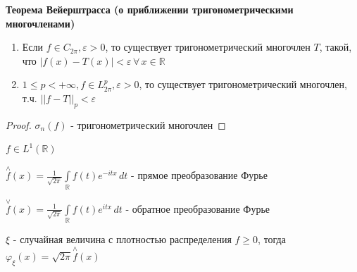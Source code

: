 \begin{theorem}
    \textbf{Теорема Вейерштрасса (о приближении тригонометрическими многочленами)}

    \begin{enumerate}
        \item {
            Если $f \in C_{2\pi}, \varepsilon > 0$, то существует тригонометрический многочлен $T$, такой, что $|f(x) - T(x)| < \varepsilon \, \forall \, x \in \mathbb{R}$
        }
        \item {
            $1 \leqslant p < +\infty, f \in L_{2\pi}^p, \varepsilon > 0$, то существует тригонометрический многочлен, т.ч. $||f - T||_p < \varepsilon$
        }
    \end{enumerate}
\end{theorem}

\begin{proof}
    $\sigma_n (f)$ - тригонометрический многочлен
\end{proof}


\begin{definition}
    $f \in L^1 (\mathbb{R})$

    $\overset{\wedge}{f} (x) = \frac{1}{\sqrt{2\pi}} \int\limits_{\mathbb{R}} f(t) e^{-itx} \, dt$ - прямое преобразование Фурье

    $\overset{\vee}{f} (x) = \frac{1}{\sqrt{2\pi}} \int\limits_{\mathbb{R}} f(t) e^{itx} \, dt$ - обратное преобразование Фурье

\end{definition}

\begin{remark}
    $\xi$ - случайная величина с плотностью распределения $f \geqslant 0$, тогда $\varphi_\xi (x) = \sqrt{2\pi} \overset{\wedge}{f} (x) $
\end{remark}

